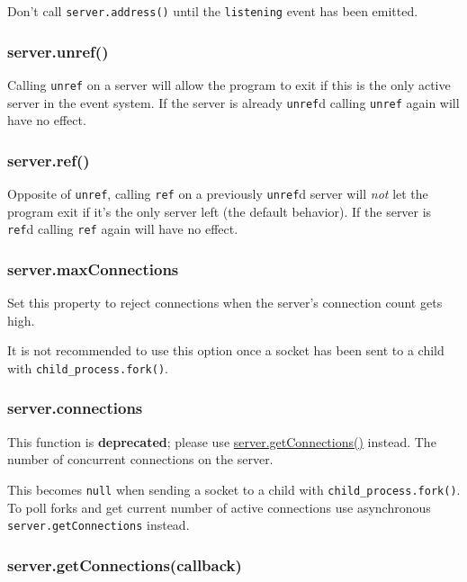 Don't call \texttt{server.address()} until the
\texttt{\textquotesingle{}listening\textquotesingle{}} event has been
emitted.

\subsubsection{server.unref()}\label{server.unref}

Calling \texttt{unref} on a server will allow the program to exit if
this is the only active server in the event system. If the server is
already \texttt{unref}d calling \texttt{unref} again will have no
effect.

\subsubsection{server.ref()}\label{server.ref}

Opposite of \texttt{unref}, calling \texttt{ref} on a previously
\texttt{unref}d server will \emph{not} let the program exit if it's the
only server left (the default behavior). If the server is \texttt{ref}d
calling \texttt{ref} again will have no effect.

\subsubsection{server.maxConnections}\label{server.maxconnections}

Set this property to reject connections when the server's connection
count gets high.

It is not recommended to use this option once a socket has been sent to
a child with \texttt{child\_process.fork()}.

\subsubsection{server.connections}\label{server.connections}

This function is \textbf{deprecated}; please use
\hyperref[netux5fserverux5fgetconnectionsux5fcallback]{server.getConnections()}
instead. The number of concurrent connections on the server.

This becomes \texttt{null} when sending a socket to a child with
\texttt{child\_process.fork()}. To poll forks and get current number of
active connections use asynchronous \texttt{server.getConnections}
instead.

\subsubsection{server.getConnections(callback)}\label{server.getconnectionscallback}

